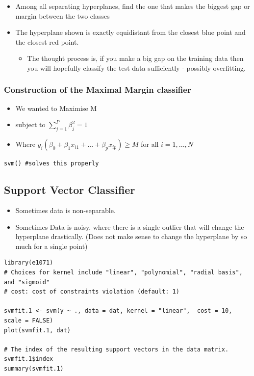 \documentclass{article}
\begin{document}
\begin{itemize}
    \item Among all separating hyperplanes, find the one that makes the biggest gap or margin between the two classes
    \item The hyperplane shown is exactly equidistant from the closest blue point and the closest red point.
    \begin{itemize}
        \item The thought process is, if you make a big gap on the training data then you will hopefully classify the test data sufficiently - possibly overfitting.
    \end{itemize}
\end{itemize}

\subsubsection{Construction of the Maximal Margin classifier}

\begin{itemize}
    \item We wanted to Maximise M
    \item subject to $\sum_{j=1}^P \beta_j^2 = 1$
    \item Where $y_i (\beta_0 + \beta_1 x_{i1} + ... + \beta_p x_{ip}) \geq M$ for all $i = 1,..., N$
\end{itemize}

\begin{lstlisting}
svm() #solves this properly
\end{lstlisting}


\subsection{Support Vector Classifier}
\begin{itemize}
    \item Sometimes data is non-separable.
    \item Sometimes Data is noisy, where there is a single outlier that will change the hyperplane drastically. (Does not make sense to change the hyperplane by so much for a single point)
\end{itemize}

\begin{lstlisting}
library(e1071)
# Choices for kernel include "linear", "polynomial", "radial basis", and "sigmoid"
# cost: cost of constraints violation (default: 1)

svmfit.1 <- svm(y ~ ., data = dat, kernel = "linear",  cost = 10, scale = FALSE)
plot(svmfit.1, dat)

# The index of the resulting support vectors in the data matrix.
svmfit.1$index
summary(svmfit.1)

\end{lstlisting}
\end{document}

